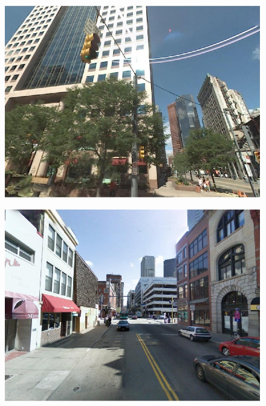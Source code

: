 \begin{figure}[!ht]
{\begin{minipage}{\subw}
{		  \includegraphics[width=1.05\linewidth]{imgs/demo03b.jpg}
		  }
		\end{minipage}
	 }
	 \colorbox{myRed}{
		\begin{minipage}{\subw}
		  \centerline{
		  \includegraphics[width=1.05\linewidth]{imgs/demo04b.jpg}
		  }
		\end{minipage}
	 }
	 \vspace{1mm}
	 \\
	 \colorbox{gray}{
		\begin{minipage}{\subw}
		  \centerline{
}
\end{minipage}}
\end{figure}
